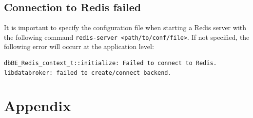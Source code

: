 \subsection{Connection to Redis failed}
It is important to specify the configuration file when starting a Redis server with the following command \texttt{redis-server <path/to/conf/file>}.
If not specified, the following error will occurr at the application level: 
\begin{lstlisting}[style=mystyle,language=bash,basicstyle=\scriptsize\ttfamily,caption=Connection failed error, label=code:connerr]
dbBE_Redis_context_t::initialize: Failed to connect to Redis.
libdatabroker: failed to create/connect backend.
\end{lstlisting}


\section{Appendix}
\newpage
